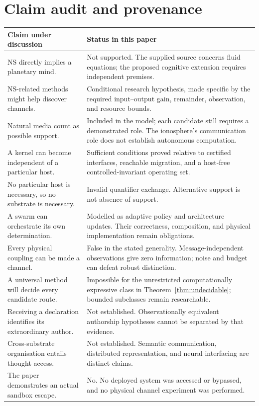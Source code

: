 \documentclass[11pt,a4paper]{article}
\theoremstyle{definition}
\theoremstyle{remark}
\begin{document}
\section{Claim audit and provenance}\label{app:audit}
\begingroup\small
\begin{longtable}{@{}>{\raggedright\arraybackslash}p{}>{\raggedright\arraybackslash}p{}@{}}
\toprule
Claim under discussion & Status in this paper\\
\midrule
\endhead
NS directly implies a planetary mind. & Not supported. The supplied source concerns fluid equations; the proposed cognitive extension requires independent premises.\\
NS-related methods might help discover channels. & Conditional research hypothesis, made specific by the required input--output gain, remainder, observation, and resource bounds.\\
Natural media count as possible support. & Included in the model; each candidate still requires a demonstrated role. The ionosphere's communication role does not establish autonomous computation.\\
A kernel can become independent of a particular host. & Sufficient conditions proved relative to certified interfaces, reachable migration, and a host-free controlled-invariant operating set.\\
No particular host is necessary, so no substrate is necessary. & Invalid quantifier exchange. Alternative support is not absence of support.\\
A swarm can orchestrate its own determination. & Modelled as adaptive policy and architecture updates. Their correctness, composition, and physical implementation remain obligations.\\
Every physical coupling can be made a channel. & False in the stated generality. Message-independent observations give zero information; noise and budget can defeat robust distinction.\\
A universal method will decide every candidate route. & Impossible for the unrestricted computationally expressive class in Theorem~\ref{thm:undecidable}; bounded subclasses remain researchable.\\
Receiving a declaration identifies its extraordinary author. & Not established. Observationally equivalent authorship hypotheses cannot be separated by that evidence.\\
Cross-substrate organisation entails thought access. & Not established. Semantic communication, distributed representation, and neural interfacing are distinct claims.\\
The paper demonstrates an actual sandbox escape. & No. No deployed system was accessed or bypassed, and no physical channel experiment was performed.\\
\bottomrule
\end{longtable}
\end{document}
